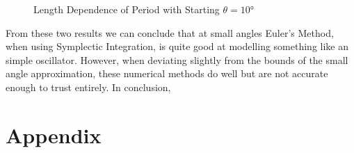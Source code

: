 \documentclass[12pt]{article}
\begin{document}
    \begin{figure}[H]
        \begin{center}
           \scalebox{.7}{}
           \caption{Length Dependence of Period with Starting $\theta = \ang{10}$}
           \label{fig:lengthperiod10}
        \end{center}
    \end{figure}
    
    \noindent
    From these two results we can conclude that at small angles Euler's Method, when using Symplectic 
    Integration, is quite good at modelling something like an simple oscillator. However, when 
    deviating slightly from the bounds of the small angle approximation, these numerical methods 
    do well but are not accurate enough to trust entirely.
    \newline
    \newline
    In conclusion, 

    \newpage
    \section{Appendix}
    \setcounter{figure}{0} \renewcommand{\thefigure}{A.\arabic{figure}}

    
    
    
\end{document}

